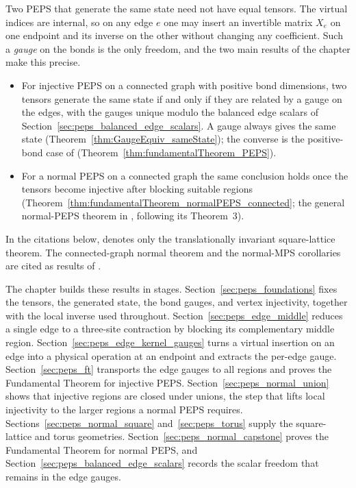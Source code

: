 Two PEPS that generate the same state need not have equal tensors. The virtual
indices are internal, so on any edge $e$ one may insert an invertible matrix
$X_e$ on one endpoint and its inverse on the other without changing any
coefficient. Such a \emph{gauge} on the bonds is the only freedom, and the two
main results of the chapter make this precise.
\begin{itemize}
    \item For injective PEPS on a connected graph with positive bond
        dimensions, two tensors generate the same state if and only if they are
        related by a gauge on the edges, with the gauges unique modulo the
        balanced edge scalars of Section~\ref{sec:peps_balanced_edge_scalars}.
        A gauge always gives the same state
        (Theorem~\ref{thm:GaugeEquiv_sameState}); the converse is the
        positive-bond case of \cite[Theorem~2]{Molnar2018NormalPEPS}
        (Theorem~\ref{thm:fundamentalTheorem_PEPS}).
    \item For a normal PEPS on a connected graph the same conclusion holds once
        the tensors become injective after blocking suitable regions
        (Theorem~\ref{thm:fundamentalTheorem_normalPEPS_connected}; the general
        normal-PEPS theorem in \cite[Section~4]{Molnar2018NormalPEPS}, following
        its Theorem~3).
\end{itemize}

In the citations below, \cite[Theorem~3]{Molnar2018NormalPEPS} denotes only
the translationally invariant square-lattice theorem. The connected-graph
normal theorem and the normal-MPS corollaries are cited as results of
\cite[Section~4]{Molnar2018NormalPEPS}.

The chapter builds these results in stages.
Section~\ref{sec:peps_foundations} fixes the tensors, the generated state, the
bond gauges, and vertex injectivity, together with the local inverse used
throughout.
Section~\ref{sec:peps_edge_middle} reduces a single edge to a three-site
contraction by blocking its complementary middle region.
Section~\ref{sec:peps_edge_kernel_gauges} turns a virtual insertion on an edge
into a physical operation at an endpoint and extracts the per-edge gauge.
Section~\ref{sec:peps_ft} transports the edge gauges to all regions and proves
the Fundamental Theorem for injective PEPS.
Section~\ref{sec:peps_normal_union} shows that injective regions are closed
under unions, the step that lifts local injectivity to the larger regions a
normal PEPS requires.
Sections~\ref{sec:peps_normal_square} and~\ref{sec:peps_torus} supply the
square-lattice and torus geometries.
Section~\ref{sec:peps_normal_capstone} proves the Fundamental Theorem for
normal PEPS, and Section~\ref{sec:peps_balanced_edge_scalars} records the scalar
freedom that remains in the edge gauges.










